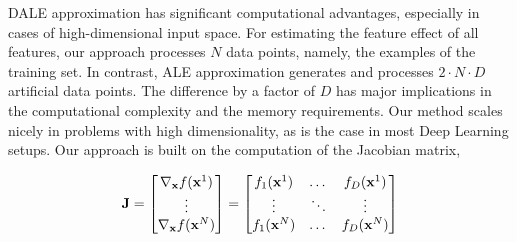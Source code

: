 DALE approximation has significant computational advantages,
especially in cases of high-dimensional input space. For estimating
the feature effect of all features, our approach processes \(N\) data
points, namely, the examples of the training set. In contrast, ALE
approximation generates and processes \(2 \cdot N \cdot D\)
artificial data points. The difference by a factor of \(D\) has major
implications in the computational complexity and the memory
requirements. Our method scales nicely in problems with high
dimensionality, as is the case in most Deep Learning setups. Our
approach is built on the computation of the Jacobian matrix,

\begin{equation} \mathbf{J} =
  \begin{bmatrix} \nabla_{\mathbf{x}}f(\mathbf{x}^1) \\ \vdots \\ \nabla_{\mathbf{x}}f(\mathbf{x}^N)
  \end{bmatrix} =
  \begin{bmatrix} f_1(\mathbf{x}^1) & \dots & f_D(\mathbf{x}^1)\\ \vdots & \ddots & \vdots \\ f_1(\mathbf{x}^N) & \dots & f_D(\mathbf{x}^N)
  \end{bmatrix}
\label{eq:jacobian}
\end{equation}

